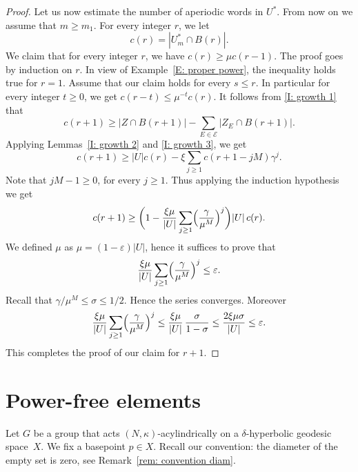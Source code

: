\documentclass[JEP,XML,SOM,Unicode, NoEqCountersInSection,published]{cedram}
\let\mathcal\mathscr
\let\epsilon\varepsilon
\theoremstyle{plain}
\theoremstyle{definition}
\begin{document}
\begin{proof}
Let us now estimate the number of aperiodic words in $U^*$.
From now on we assume that $m \geq m_1$.
For every integer $r$, we let
\begin{equation*}
c(r) = | U^*_m \cap B(r)|.
\end{equation*}
We claim that for every integer $r$, we have $c(r) \geq \mu c(r-1)$.
The proof goes by induction on $r$.
In view of Example~\ref{E: proper power}, the inequality holds true for $r = 1$.
Assume that our claim holds for every $s \leq r$.
In particular for every integer $t \geq 0$, we get $c(r -t) \leq \mu^{-t}c(r)$.
It follows from \eqref{I: growth 1} that
\begin{equation*}
c(r+1) \geq | Z \cap B(r+1)| - \sum_{E \in \mathcal E} |Z_E\cap B(r+1)|.
\end{equation*}
Applying Lemmas~\ref{I: growth 2} and \ref{I: growth 3}, we get
\begin{equation*}
c(r+1) \geq |U| c(r) - \xi
\sum_{j\geqslant 1} c(r+1 -jM)\gamma^j.
\end{equation*}
Note that $jM - 1 \geq 0$, for every $j \geq 1$.
Thus applying the induction hypothesis we get
\begin{equation*}
c(r+1)
\geq \biggl( 1 -\frac {\xi\mu} {|U|}\sum_{j \geq 1} \Bigl(\frac{\gamma}{\mu^M}\Bigr)^j\biggr) |U|\, c(r).
\end{equation*}
We defined $\mu$ as $\mu = (1 - \epsilon)|U|$, hence it suffices to prove that
\begin{equation*}
\frac {\xi\mu} {|U|}\sum_{j \geq 1} \Bigl(\frac{\gamma}{\mu^M}\Bigr)^j \leq \epsilon.
\end{equation*}
Recall that $\gamma/\mu^M \leq \sigma \leq 1/2$.
Hence the series converges.
Moreover
\begin{equation*}
\frac {\xi\mu} {|U|}\sum_{j \geq 1} \Bigl(\frac{\gamma}{\mu^M}\Bigr)^j
\leq \frac {\xi\mu} {|U|}\, \frac {\sigma}{1 - \sigma}
\leq \frac {2\xi\mu\sigma} {|U|}
\leq \epsilon.
\end{equation*}
This completes the proof of our claim for $r+1$.
\end{proof}

\section{Power-free elements}
\label{sec: power-free elements}

Let $G$ be a group that acts $(N,\kappa)$-acylindrically on a $\delta$-hyperbolic geodesic space~$X$.
We fix a basepoint $p \in X$.
Recall our convention: the diameter of the empty set is zero, see Remark~\ref{rem: convention diam}.
\end{document}
